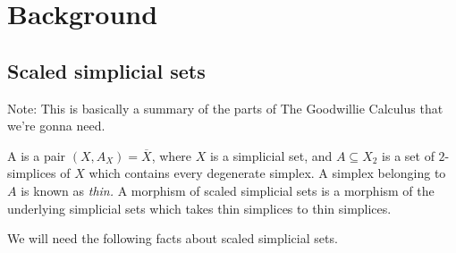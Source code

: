 \documentclass[main.tex]{subfiles}
\begin{document}
\section{Background}
\label{sec:background}

\subsection{Scaled simplicial sets}
\label{ssc:scal}

Note: This is basically a summary of the parts of The Goodwillie Calculus that we're gonna need.

\begin{definition}
  \label{def:scaled_simplicial_set}
  A  is a pair $(X, A_{X}) = \overline{X}$, where $X$ is a simplicial set, and $A \subseteq X_{2}$ is a set of $2$-simplices of $X$ which contains every degenerate simplex. A simplex belonging to $A$ is known as \emph{thin.} A morphism of scaled simplicial sets is a morphism of the underlying simplicial sets which takes thin simplices to thin simplices.
\end{definition}

We will need the following facts about scaled simplicial sets.
\end{document}

